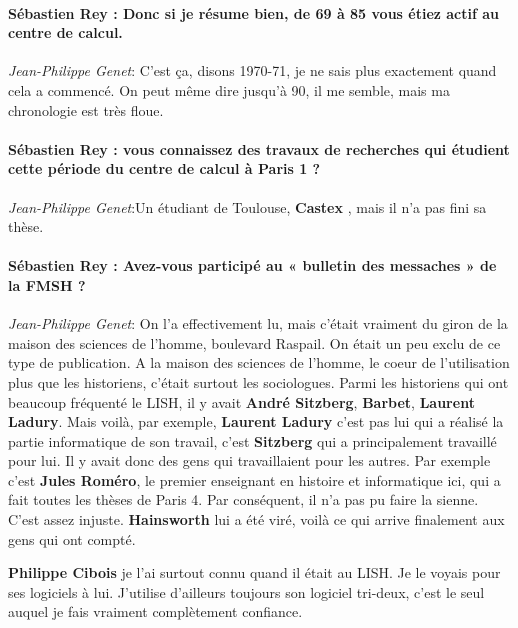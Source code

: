 \paragraph*{Sébastien Rey : Donc si je résume bien, de 69 à 85 vous étiez actif au centre de calcul.}

\noindent\emph{Jean-Philippe Genet}: C'est ça, disons 1970-71, je ne sais plus exactement quand cela a commencé. On peut même dire jusqu'à 90, il me semble, mais ma chronologie est très floue.

\paragraph*{Sébastien Rey : vous connaissez des travaux de recherches qui étudient cette période du centre de calcul à Paris 1 ? }  

\noindent\emph{Jean-Philippe Genet}:Un étudiant de Toulouse, \textbf{Castex} , mais il n'a pas fini sa thèse. 

\paragraph*{Sébastien Rey : Avez-vous participé au « bulletin des messaches » de la FMSH ?}

\noindent\emph{Jean-Philippe Genet}: On l'a effectivement lu, mais c'était vraiment du giron de la maison des sciences de l'homme, boulevard Raspail. On était un peu exclu de ce type de publication. A la maison des sciences de l'homme, le coeur de l'utilisation plus que les historiens, c'était surtout les sociologues. Parmi les historiens qui ont beaucoup fréquenté le LISH, il y avait  \textbf{André Sitzberg}, \textbf{Barbet}, \textbf{Laurent Ladury}. Mais voilà, par exemple, \textbf{Laurent Ladury} c'est pas lui qui a réalisé la partie informatique de son travail, c'est \textbf{Sitzberg} qui a principalement travaillé pour lui. Il y avait donc des gens qui travaillaient pour les autres. Par exemple c'est \textbf{Jules Roméro}, le premier enseignant en histoire et informatique ici, qui a fait toutes les thèses de Paris 4. Par conséquent, il n'a pas pu faire la sienne. C'est assez injuste. \textbf{Hainsworth} lui a été viré, voilà ce qui arrive finalement aux gens qui ont compté.

\textbf{Philippe Cibois} je l'ai surtout connu quand il était au LISH. Je le voyais pour ses logiciels à lui. J'utilise d'ailleurs toujours son logiciel tri-deux, c'est le seul auquel je fais vraiment complètement confiance.



